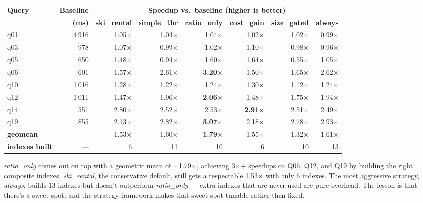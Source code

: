 \documentclass[10pt,a4paper]{article}
\begin{document}
\begin{table}[h]
\centering\small
\begin{tabular}{lrrrrrrr}
\toprule
\textbf{Query} & \textbf{Baseline} & \multicolumn{6}{c}{\textbf{Speedup vs.\ baseline (higher is better)}} \\
\cmidrule(lr){3-8}
                &  \textbf{(ms)} & \textbf{ski\_rental} & \textbf{simple\_thr} & \textbf{ratio\_only} & \textbf{cost\_gain} & \textbf{size\_gated} & \textbf{always} \\
\midrule
q01   & 4\,916  & 1.05$\times$ & 1.04$\times$ & 1.04$\times$ & 1.02$\times$ & 1.02$\times$ & 0.99$\times$ \\
q03   &   978   & 1.07$\times$ & 0.99$\times$ & 1.02$\times$ & 1.10$\times$ & 0.98$\times$ & 0.96$\times$ \\
q05   &   650   & 1.48$\times$ & 0.94$\times$ & 1.60$\times$ & 1.64$\times$ & 0.55$\times$ & 1.05$\times$ \\
q06   &   601   & 1.57$\times$ & 2.61$\times$ & \textbf{3.20$\times$} & 1.50$\times$ & 1.65$\times$ & 2.62$\times$ \\
q10   & 1\,016  & 1.28$\times$ & 1.22$\times$ & 1.24$\times$ & 1.30$\times$ & 1.12$\times$ & 1.24$\times$ \\
q12   & 1\,011  & 1.47$\times$ & 1.96$\times$ & \textbf{2.06$\times$} & 1.48$\times$ & 1.75$\times$ & 1.94$\times$ \\
q14   &   551   & 2.80$\times$ & 2.52$\times$ & 2.53$\times$ & \textbf{2.91$\times$} & 2.51$\times$ & 2.49$\times$ \\
q19   &   855   & 2.13$\times$ & 2.82$\times$ & \textbf{3.07$\times$} & 2.18$\times$ & 2.78$\times$ & 2.93$\times$ \\
\midrule
\textbf{geomean} & ---    & 1.53$\times$ & 1.60$\times$ & \textbf{1.79$\times$} & 1.55$\times$ & 1.32$\times$ & 1.61$\times$ \\
\textbf{indexes built} & --- & 6 & 11 & 10 & 6 & 10 & 13 \\
\bottomrule
\end{tabular}
\end{table}

\noindent
\emph{ratio\_only} comes out on top with a geometric mean of
$\sim$1.79$\times$, achieving 3$\times$+ speedups on Q06, Q12, and
Q19 by building the right composite indexes. \emph{ski\_rental},
the conservative default, still gets a respectable 1.53$\times$
with only 6 indexes. The most aggressive strategy, \emph{always},
builds 13 indexes but doesn't outperform \emph{ratio\_only} ---
extra indexes that are never used are pure overhead. The lesson
is that there's a sweet spot, and the strategy framework makes
that sweet spot tunable rather than fixed.
\end{document}

